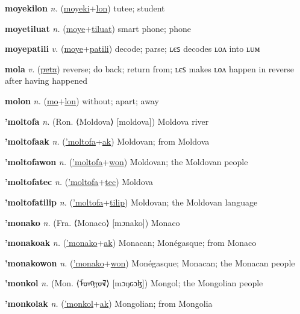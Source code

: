\textbf{\hypertarget{moyekilon}{moyekilon}} \textit{n.} (\hyperlink{moyeki}{moyeki}+\allowbreak \hyperlink{lon}{lon})
tutee; student

\textbf{\hypertarget{moyetiluat}{moyetiluat}} \textit{n.} (\hyperlink{moye}{moye}+\allowbreak \hyperlink{tiluat}{tiluat})
smart phone; phone

\textbf{\hypertarget{moyepatili}{moyepatili}} \textit{v.} (\hyperlink{moye}{moye}+\allowbreak \hyperlink{patili}{patili})
decode; parse; ʟєꜱ decodes ʟᴏᴧ into ʟᴜᴍ

\textbf{\hypertarget{mola}{mola}} \textit{v.} (\hyperlink{peta}{\sout{peta}})
reverse; do back; return from; ʟєꜱ makes ʟᴏᴧ happen in reverse after having happened

\textbf{\hypertarget{molon}{molon}} \textit{n.} (\hyperlink{mo}{mo}+\allowbreak \hyperlink{lon}{lon})
without; apart; away

\textbf{\hypertarget{'moltofa}{'moltofa}} \textit{n.} (Ron. ⟨Moldova⟩ [moldova])
Moldova river

\textbf{\hypertarget{'moltofaak}{'moltofaak}} \textit{n.} (\hyperlink{'moltofa}{'moltofa}+\allowbreak \hyperlink{ak}{ak})
Moldovan; from Moldova

\textbf{\hypertarget{'moltofawon}{'moltofawon}} \textit{n.} (\hyperlink{'moltofa}{'moltofa}+\allowbreak \hyperlink{won}{won})
Moldovan; the Moldovan people

\textbf{\hypertarget{'moltofatec}{'moltofatec}} \textit{n.} (\hyperlink{'moltofa}{'moltofa}+\allowbreak \hyperlink{tec}{tec})
Moldova

\textbf{\hypertarget{'moltofatilip}{'moltofatilip}} \textit{n.} (\hyperlink{'moltofa}{'moltofa}+\allowbreak \hyperlink{tilip}{tilip})
Moldovan; the Moldovan language

\textbf{\hypertarget{'monako}{'monako}} \textit{n.} (Fra. ⟨Monaco⟩ [mɔnako])
Monaco

\textbf{\hypertarget{'monakoak}{'monakoak}} \textit{n.} (\hyperlink{'monako}{'monako}+\allowbreak \hyperlink{ak}{ak})
Monacan; Monégasque; from Monaco

\textbf{\hypertarget{'monakowon}{'monakowon}} \textit{n.} (\hyperlink{'monako}{'monako}+\allowbreak \hyperlink{won}{won})
Monégasque; Monacan; the Monacan people

\textbf{\hypertarget{'monkol}{'monkol}} \textit{n.} (Mon. ⟨{\mongolian{}ᠮᠣᠩᠭᠣᠯ}⟩ [mɔŋɢɔɮ])
Mongol; the Mongolian people

\textbf{\hypertarget{'monkolak}{'monkolak}} \textit{n.} (\hyperlink{'monkol}{'monkol}+\allowbreak \hyperlink{ak}{ak})
Mongolian; from Mongolia

